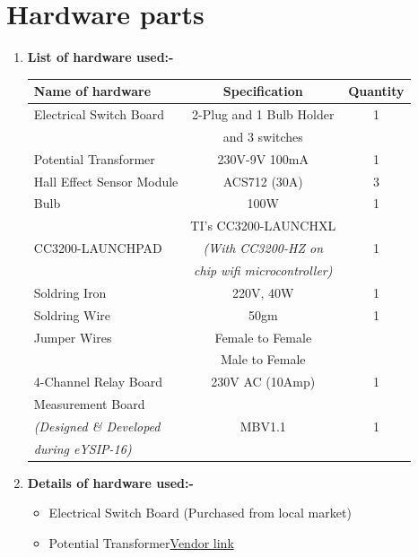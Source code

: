 \documentclass[a4paper,12pt,oneside]{book}
\begin{document}
\newpage
\section{Hardware parts}
\begin{enumerate}
  \item \textbf{List of hardware used:-}\\
  
		 \begin{tabular}{|l|c|c|}
		 	\hline
		 	\textbf{Name of hardware} & \textbf{Specification} & \textbf{Quantity} \\ \hline
		 	Electrical Switch Board& 2-Plug and 1 Bulb Holder & 1\\ 
		 	& and 3 switches&\\\hline
		 	Potential Transformer& 230V-9V 100mA &1 \\ \hline
		 	Hall Effect Sensor Module& ACS712 (30A) &3\\ \hline
		 	Bulb& 100W & 1\\ \hline
		 	& TI's CC3200-LAUNCHXL&\\
		 	CC3200-LAUNCHPAD&\textit{(With CC3200-HZ on } &1 \\
		 	&\textit{ chip wifi microcontroller)} &\\\hline
		 	Soldring Iron& 220V, 40W &1 \\ \hline
		 	Soldring Wire& 50gm & 1 \\ \hline
		 	Jumper Wires& Female to Female & \\\cline{2-3}
		 	&Male to Female& \\\hline
		 	4-Channel Relay Board& 230V AC (10Amp)& 1\\ \hline
		 	Measurement Board& & \\ 
		 	\textit{(Designed \& Developed } & MBV1.1 & 1 \\
		 	\textit{ \hspace{1cm} during eYSIP-16) } & & \\ \hline
		 \end{tabular}
		 \vspace{1cm}
	\item \textbf{Details of hardware used:-}
	\begin{itemize}
		  \item Electrical Switch Board (Purchased from local market) 
		  \item Potential Transformer\href{http://www.industrybuying.com/transformer-transformers-EL.TR1.380140/?utm_source=Google&utm_medium=PLA&utm_campaign=0_PLA_HPP&gclid=Cj0KEQjw_eu8BRDC-YLHusmTmMEBEiQArW6c-KfZiqs2kmbBI3vn0sM1cPt5KuvFcSrQhloBs1NVNrYaAr428P8HAQ}{Vendor link} 

\end{itemize}
\end{enumerate}
\end{document}
